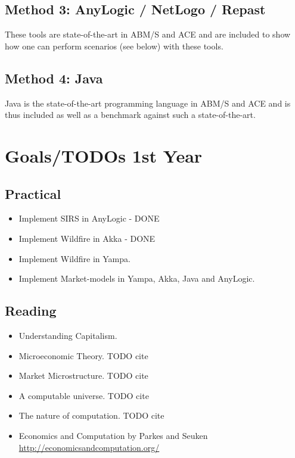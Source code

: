 \documentclass{article}
\begin{document}
\subsection{Method 3: AnyLogic / NetLogo / Repast}
These tools are state-of-the-art in ABM/S and ACE and are included to show how one can perform scenarios (see below) with these tools.

\subsection{Method 4: Java}
Java is the state-of-the-art programming language in ABM/S and ACE and is thus included as well as a benchmark against such a state-of-the-art.


\pagebreak

\section{Goals/TODOs 1st Year}
\subsection{Practical}
\begin{itemize}
\item Implement SIRS in AnyLogic - DONE
\item Implement Wildfire in Akka - DONE
\item Implement Wildfire in Yampa.
\item Implement Market-models in Yampa, Akka, Java and AnyLogic.
\end{itemize}

\subsection{Reading}
\begin{itemize}
\item Understanding Capitalism. \cite{bowles_understanding_2005}
\item Microeconomic Theory. TODO cite
\item Market Microstructure. TODO cite
\item A computable universe. TODO cite
\item The nature of computation. TODO cite
\item Economics and Computation by Parkes and Seuken \url{http://economicsandcomputation.org/}
\end{itemize}
\end{document}
